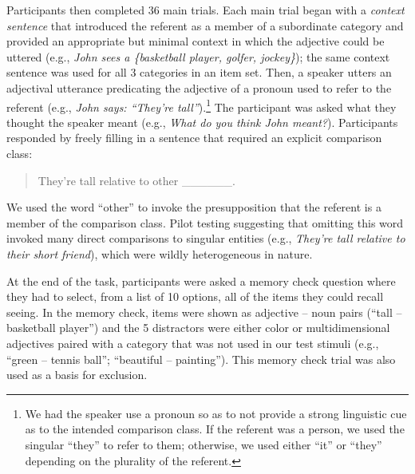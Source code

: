 \documentclass[doc]{apa6}
\begin{document}

Participants then completed 36 main trials. Each main trial began with a \emph{context sentence} that introduced the referent as a member of a subordinate category and provided an appropriate but minimal context in which the adjective could be uttered (e.g., \emph{John sees a \{basketball player, golfer, jockey\}}); the same context sentence was used for all 3 categories in an item set.
Then, a speaker utters an adjectival utterance predicating the adjective of a pronoun used to refer to the referent (e.g., \emph{John says: ``They're tall''}).\footnote{
We had the speaker use a pronoun so as to not provide a strong linguistic cue as to the intended comparison class. If the referent was a person, we used  the singular ``they'' to refer to them; otherwise, we used either ``it'' or ``they'' depending on the plurality of the referent. 
}
The participant was asked what they thought the speaker meant (e.g., \emph{What do you think John meant?}). Participants responded by freely filling in a sentence that required an explicit comparison class: 

\begin{quote}
They're tall relative to other \_\_\_\_\_\_.
\end{quote}

We used the word ``other'' to invoke the presupposition that the referent is a member of the comparison class. Pilot testing suggesting that omitting this word invoked many direct comparisons to singular entities (e.g., \emph{They're tall relative to their short friend}), which were wildly heterogeneous in nature. 

At the end of the task, participants were asked a memory check question where they had to select, from a list of 10 options, all of the items they could recall seeing. In the memory check, items were shown as adjective -- noun pairs (``tall -- basketball player'') and the 5 distractors were either color or multidimensional adjectives paired with a category that was not used in our test stimuli (e.g., ``green -- tennis ball''; ``beautiful -- painting'').
This memory check trial was also used as a basis for exclusion. 
\end{document}
